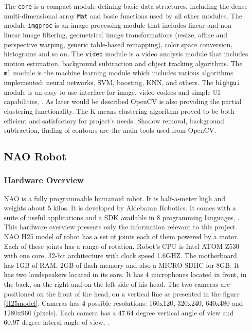     The \verb|core| is a compact module defining basic data structures, including the dense multi-dimensional array \verb|Mat| and basic functions used by all other modules. The module \verb|imgproc| is an image processing module that includes linear and non-linear image filtering, geometrical image transformations (resize, affine and perspective warping, generic table-based remapping), color space conversion, histograms and so on. The \verb|video| module is a video analysis module that includes motion estimation, background subtraction and object tracking algorithms. The \verb|ml| module is the machine learning module which includes various algorithms implemented: neural networks, SVM, boosting, KNN, and others. The \verb|highgui| module is an easy-to-use interface for image, video codecs and simple UI capabilities, \cite{opencv}. As later would be described OpenCV is also providing the partial clustering functionality. The K-means clustering algorithm proved to be both efficient and satisfactory for project's needs. Shadow removal, background subtraction, finding of contours are the main tools used from OpenCV.
\subsection{NAO Robot}
    \subsubsection{Hardware Overview}
        NAO is a fully programmable humanoid robot. It is half-a-meter high and weights about 5 kilos. It is developed by Aldebaran Robotics. It comes with a suite of useful applications and a SDK available in 8 programming languages, \cite{naoDocumentation}.
        This hardware overview presents only the information relevant to this project. NAO H25 model of robot has a set of joints each of them powered by a motor. Each of these joints has a range of rotation. Robot’s CPU is Intel ATOM Z530 with one core, 32-bit architecture with clock speed 1.6GHZ. The motherboard has 1GB of RAM, 2GB of flash memory and also a MICRO SDHC for 8GB. It has two loudspeakers located in its ears. It has 4 microphones located in front, in the back, on the right and on the left side of his head. The two cameras are positioned on the front of the head, on a vertical line as presented in the figure \ref{H25model}. Cameras has 4 possible resolutions: 160x120, 320x240, 640x480 and 1280x960 (pixels). Each camera has a 47.64 degree vertical angle of view and 60.97 degree lateral angle of view, \cite{naoDocumentation}. 

